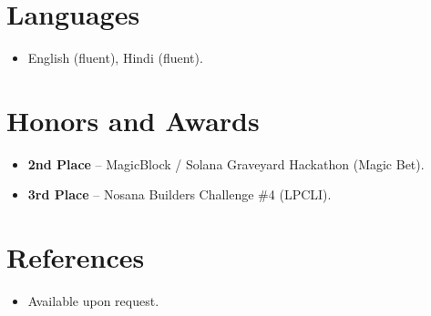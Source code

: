 \documentclass[11pt,a4paper,sans]{moderncv}
\begin{document}

\section{Languages}
\vspace{1pt}
\begin{itemize}
\item English (fluent), Hindi (fluent).
\end{itemize}


\section{Honors and Awards}
\vspace{1pt}
\begin{itemize}
\item{\textbf{2nd Place} -- MagicBlock / Solana Graveyard Hackathon (Magic Bet).}
\item{\textbf{3rd Place} -- Nosana Builders Challenge \#4 (LPCLI).}
\end{itemize}


\section{References}
\vspace{1pt}
\begin{itemize}
\item{Available upon request.}
\end{itemize}
\end{document}
